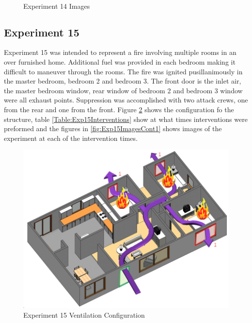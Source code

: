 \documentclass{article}
\begin{document}
\begin{figure}[H]
	\ContinuedFloat 
	\centering 
	 \ 
	\caption{Experiment 14 Images}
	\label{fig:Experiment14ImagesCont3} 
\end{figure}

\subsection{Experiment 15}
Experiment 15 was intended to represent a fire involving multiple rooms in an over furnished home. Additional fuel was provided in each bedroom making it difficult to maneuver through the rooms. The fire was ignited pusillanimously in the master bedroom, bedroom 2 and bedroom 3. The front door is the inlet air, the master bedroom window, rear window of bedroom 2 and bedroom 3 window were all exhaust points. Suppression was accomplished with two attack crews, one from the rear and one from the front. Figure \ref{fig:Exp15VentConfig} shows the configuration fo the structure, table \ref{Table:Exp15Interventions} show at what times interventions were preformed and the figures in \ref{fig:Exp15ImagesCont1} shows images of the experiment at each of the intervention times.

\begin{figure}[h!]
	\centering
	\includegraphics[width=5in]{0_Images/FireExperiments/Single_Story/Experiment_15.jpg}
	\caption{Experiment 15 Ventilation Configuration}
	\label{fig:Exp15VentConfig}
\end{figure}
\end{document}
